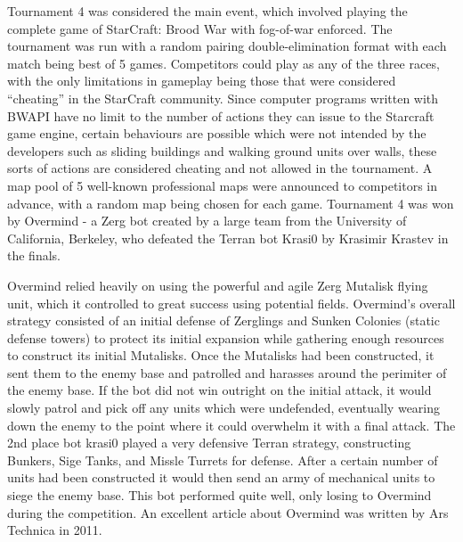 Tournament 4 was considered the main event, which involved playing the complete game of StarCraft: Brood War with fog-of-war enforced. The tournament was run with a random pairing double-elimination format with each match being best of 5 games. Competitors could play as any of the three races, with the only limitations in gameplay being those that were considered ``cheating'' in the StarCraft community. Since computer programs written with BWAPI have no limit to the number of actions they can issue to the Starcraft game engine, certain behaviours are possible which were not intended by the developers such as sliding buildings and walking ground units over walls, these sorts of actions are considered cheating and not allowed in the tournament. A map pool of 5 well-known professional maps were announced to competitors in advance, with a random map being chosen for each game. Tournament 4 was won by Overmind - a Zerg bot created by a large team from the University of California, Berkeley, who defeated the Terran bot Krasi0 by Krasimir Krastev in the finals.

Overmind relied heavily on using the powerful and agile Zerg Mutalisk flying unit, which it controlled to great success using potential fields. Overmind's overall strategy consisted of an initial defense of Zerglings and Sunken Colonies (static defense towers) to protect its initial expansion while gathering enough resources to construct its initial Mutalisks. Once the Mutalisks had been constructed, it sent them to the enemy base and patrolled and harasses around the perimiter of the enemy base. If the bot did not win outright on the initial attack, it would slowly patrol and pick off any units which were undefended, eventually wearing down the enemy to the point where it could overwhelm it with a final attack. The 2nd place bot krasi0 played a very defensive Terran strategy, constructing Bunkers, Sige Tanks, and Missle Turrets for defense. After a certain number of units had been constructed it would then send an army of mechanical units to siege the enemy base. This bot performed quite well, only losing to Overmind during the competition. An excellent article about Overmind was written by Ars Technica in 2011.

